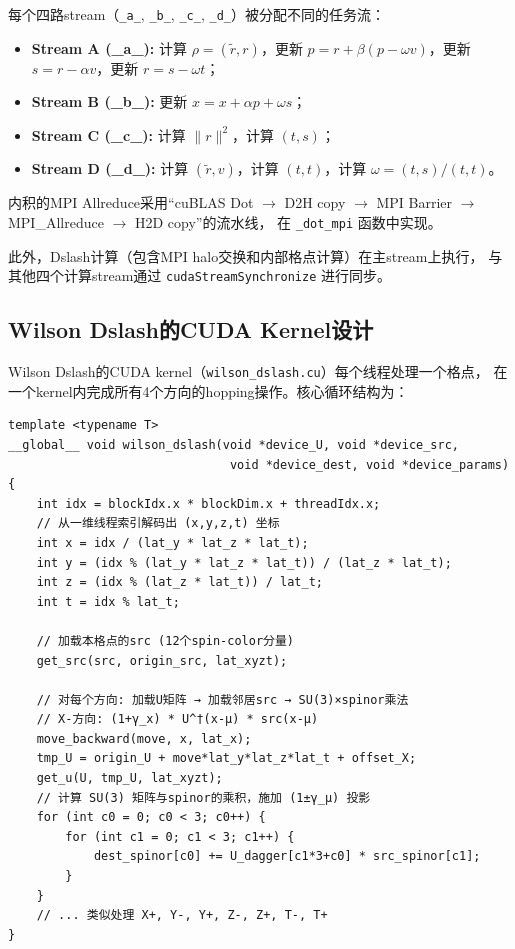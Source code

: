 \documentclass[11pt,a4paper]{article}
\begin{document}
每个四路stream（\texttt{\_a\_}, \texttt{\_b\_}, \texttt{\_c\_}, \texttt{\_d\_}）被分配不同的任务流：
\begin{itemize}
    \item \textbf{Stream A (\_a\_):} 计算 $\rho = (\tilde{r}, r)$，更新 $p = r + \beta(p - \omega v)$，更新 $s = r - \alpha v$，更新 $r = s - \omega t$；
    \item \textbf{Stream B (\_b\_):} 更新 $x = x + \alpha p + \omega s$；
    \item \textbf{Stream C (\_c\_):} 计算 $\|r\|^2$，计算 $(t, s)$；
    \item \textbf{Stream D (\_d\_):} 计算 $(\tilde{r}, v)$，计算 $(t, t)$，计算 $\omega = (t,s)/(t,t)$。
\end{itemize}

内积的MPI Allreduce采用``cuBLAS Dot $\to$ D2H copy $\to$ MPI Barrier $\to$ MPI\_Allreduce $\to$ H2D copy''的流水线，
在 \texttt{\_dot\_mpi} 函数中实现。

此外，Dslash计算（包含MPI halo交换和内部格点计算）在主stream上执行，
与其他四个计算stream通过 \texttt{cudaStreamSynchronize} 进行同步。

\subsection{Wilson Dslash的CUDA Kernel设计}

Wilson Dslash的CUDA kernel（\texttt{wilson\_dslash.cu}）每个线程处理一个格点，
在一个kernel内完成所有4个方向的hopping操作。核心循环结构为：

\begin{lstlisting}[style=cppstyle]
template <typename T>
__global__ void wilson_dslash(void *device_U, void *device_src,
                               void *device_dest, void *device_params) {
    int idx = blockIdx.x * blockDim.x + threadIdx.x;
    // 从一维线程索引解码出 (x,y,z,t) 坐标
    int x = idx / (lat_y * lat_z * lat_t);
    int y = (idx % (lat_y * lat_z * lat_t)) / (lat_z * lat_t);
    int z = (idx % (lat_z * lat_t)) / lat_t;
    int t = idx % lat_t;

    // 加载本格点的src (12个spin-color分量)
    get_src(src, origin_src, lat_xyzt);

    // 对每个方向: 加载U矩阵 → 加载邻居src → SU(3)×spinor乘法
    // X-方向: (1+γ_x) * U^†(x-μ) * src(x-μ)
    move_backward(move, x, lat_x);
    tmp_U = origin_U + move*lat_y*lat_z*lat_t + offset_X;
    get_u(U, tmp_U, lat_xyzt);
    // 计算 SU(3) 矩阵与spinor的乘积，施加 (1±γ_μ) 投影
    for (int c0 = 0; c0 < 3; c0++) {
        for (int c1 = 0; c1 < 3; c1++) {
            dest_spinor[c0] += U_dagger[c1*3+c0] * src_spinor[c1];
        }
    }
    // ... 类似处理 X+, Y-, Y+, Z-, Z+, T-, T+
}
\end{lstlisting}
\end{document}
